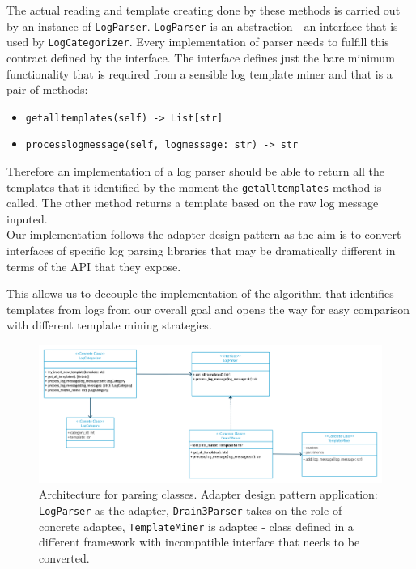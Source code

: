 The actual reading and template creating done by these methods is carried out by an instance of \texttt{LogParser}. \texttt{LogParser} is an abstraction - an interface that is used by \texttt{LogCategorizer}. Every implementation of parser needs to fulfill this contract defined by the interface. The interface defines just the bare minimum functionality that is required from a sensible log template miner and that is a pair of methods:
\begin{itemize}
    \item \texttt{get\textunderscore all\textunderscore templates(self) -> List[str]}
    \item \texttt{process\textunderscore log\textunderscore message(self, log\textunderscore message: str) -> str}
\end{itemize}
Therefore an implementation of a log parser should be able to return all the templates that it identified by the moment the \texttt{get\textunderscore all\textunderscore templates} method is called. The other method returns a template based on the raw log message inputed.\\

Our implementation follows the adapter design pattern \cite{gamma1995design_pattern_adapter} as the aim is to convert interfaces of specific log parsing libraries that may be dramatically different in terms of the API that they expose.

This allows us to decouple the implementation of the algorithm that identifies templates from logs from our overall goal and opens the way for easy comparison with different template mining strategies.\\

\begin{figure}[!tbp]
    \includegraphics[width=\textwidth]{img/UML Adapter LogParser.png}		    
    \caption{Architecture for parsing classes. Adapter design pattern application: \texttt{LogParser} as the adapter, \texttt{Drain3Parser} takes on the role of concrete adaptee, \texttt{TemplateMiner} is adaptee - class defined in a different framework with incompatible interface that needs to be converted.}
	\label{fig:uml_parsers}
\end{figure}

